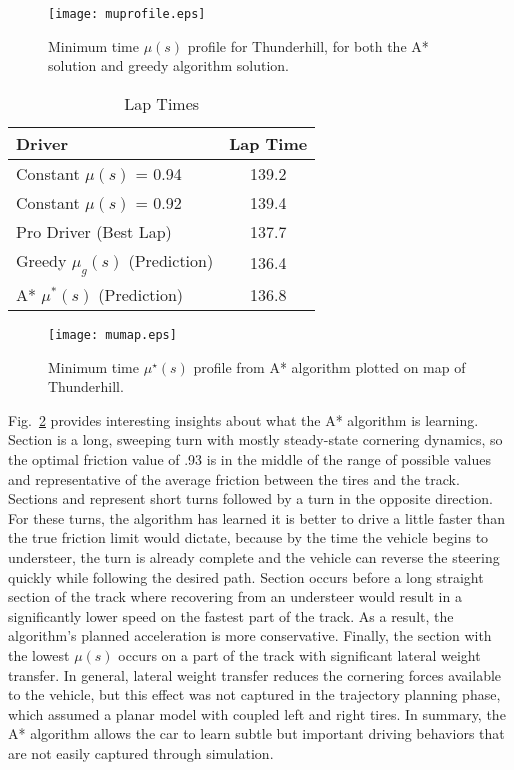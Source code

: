 {{{ \begin{figure}[tb]
\centering
\texttt{[image: muprofile.eps]}
\caption{Minimum time $\mu(s)$ profile for Thunderhill, for both the A* solution and greedy algorithm solution.}
\label{fig:muprof}
\end{figure}  

 \begin{table}[h]
\begin{center}
\caption{Lap Times}\label{tb:predresults}
\begin{tabular}{l|c}
Driver          & Lap Time \\\hline
Constant $\mu(s)$ = 0.94 & 139.2 \\
Constant $\mu(s)$ = 0.92 & 139.4 \\
Pro Driver (Best Lap)   & 137.7\\\hline
Greedy $\mu_g(s)$ (Prediction) & 136.4 \\
A*     $\mu^*(s)$ (Prediction) & 136.8 \\\hline
\end{tabular}
\end{center}
\end{table}
 
\begin{figure}[tb]
\centering
\texttt{[image: mumap.eps]}
\caption{Minimum time $\mu^\star(s)$ profile from A* algorithm plotted on map of Thunderhill.}
\label{fig:mumap}
\end{figure}  

Fig.~\ref{fig:mumap} provides interesting insights about what the A* algorithm is learning. Section  is a 
long, sweeping turn with mostly steady-state cornering dynamics, so the optimal friction value of .93 is in the middle
of the range of possible values and representative of the average friction between the tires and the track. Sections 
and  represent short turns followed by a turn in the opposite direction. For these turns, the algorithm has learned it is better to drive a little
 faster than the true friction limit would dictate, because by the time the vehicle begins to understeer, the turn is already complete and
 the vehicle can reverse the steering quickly while following the desired path. Section  occurs before a long straight section of the track where recovering
from an understeer would result in a significantly lower speed on the fastest part of the track. As a result, the algorithm's planned acceleration is more conservative. Finally, 
the section with the lowest $\mu(s)$ occurs on a part of the track with significant lateral weight transfer. In general, lateral weight transfer reduces the cornering forces available
to the vehicle, but this effect was not captured in the trajectory planning phase, which assumed a planar model with coupled left and right tires. In summary, the A*
algorithm allows the car to learn subtle but important driving behaviors that are not easily captured through simulation. 

}}}
